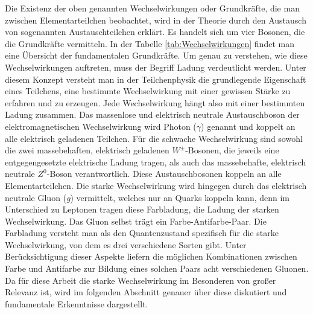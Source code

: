 \documentclass[12pt,a4paper]{report}
\begin{document}
Die Existenz der oben genannten Wechselwirkungen oder Grundkräfte, die man zwischen Elementarteilchen beobachtet, wird in der Theorie durch den Austausch von sogenannten Austauschteilchen erklärt. Es handelt sich um vier Bosonen, die die Grundkräfte vermitteln. In der Tabelle \ref{tab:Wechselwirkungen} findet man eine Übersicht der fundamentalen Grundkräfte. Um genau zu verstehen, wie diese Wechselwirkungen auftreten, muss der Begriff \glqq Ladung\grqq{} verdeutlicht werden. Unter diesem Konzept versteht man in der Teilchenphysik die grundlegende Eigenschaft eines Teilchens, eine bestimmte Wechselwirkung mit einer gewissen Stärke zu erfahren und zu erzeugen. Jede Wechselwirkung hängt also mit einer bestimmten Ladung zusammen. Das massenlose und elektrisch neutrale Austauschboson der elektromagnetischen Wechselwirkung wird Photon ($\gamma$) genannt und koppelt an alle elektrisch geladenen Teilchen. Für die schwache Wechselwirkung sind sowohl die zwei massebehaften, elektrisch geladenen $W^{\pm}$-Bosonen, die jeweils eine entgegengesetzte elektrische Ladung tragen, als auch das massebehafte, elektrisch neutrale $Z^{0}$-Boson verantwortlich. Diese Austauschbosonen koppeln an alle Elementarteilchen. Die starke Wechselwirkung wird hingegen durch das elektrisch neutrale Gluon (\textit{g}) vermittelt, welches nur an Quarks koppeln kann, denn im Unterschied zu Leptonen tragen diese Farbladung, die Ladung der starken Wechselwirkung. Das Gluon selbst trägt ein Farbe-Antifarbe-Paar. Die Farbladung versteht man als den Quantenzustand spezifisch für die starke Wechselwirkung, von dem es drei verschiedene Sorten gibt. Unter Berücksichtigung dieser Aspekte liefern die möglichen Kombinationen zwischen Farbe und Antifarbe zur Bildung eines solchen Paars acht verschiedenen Gluonen. Da für diese Arbeit die starke Wechselwirkung im Besonderen von großer Relevanz ist, wird im folgenden Abschnitt genauer über diese diskutiert und fundamentale Erkenntnisse dargestellt.
\end{document}
